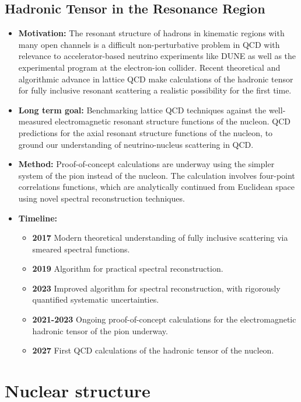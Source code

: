 \documentclass[12pt,hyperpdf]{article}
\begin{document}
\subsection{Hadronic Tensor in the Resonance Region}
\begin{itemize}
    \item{\bf Motivation:} The resonant structure of hadrons in kinematic regions with many open channels is a difficult non-perturbative problem in QCD with relevance to accelerator-based neutrino experiments like DUNE as well as the experimental program at the electron-ion collider.
    Recent theoretical and algorithmic advance in lattice QCD make calculations of the hadronic tensor for fully inclusive resonant scattering a realistic possibility for the first time.
    \item{\bf Long term goal:}
    Benchmarking lattice QCD techniques against the well-measured electromagnetic resonant structure functions of the nucleon.
    QCD predictions for the axial resonant structure functions of the nucleon, to ground our understanding of neutrino-nucleus scattering in QCD.
    \item{\bf Method:} Proof-of-concept calculations are underway using the simpler system of the pion instead of the nucleon.
	The calculation involves four-point correlations functions, which are analytically continued from Euclidean space using novel spectral reconstruction techniques.
\item{\bf Timeline:}
\begin{itemize}
    \item{\bf 2017} Modern theoretical understanding of fully inclusive scattering via smeared spectral functions.~\cite{Hansen:2017mnd}
    \item{\bf 2019} Algorithm for practical spectral reconstruction.~\cite{Hansen:2019idp}
    \item{\bf 2023} Improved algorithm for spectral reconstruction, with rigorously quantified systematic uncertainties.
    \item{\bf 2021-2023} Ongoing proof-of-concept calculations for the electromagnetic hadronic tensor of the pion underway.
    \item{\bf 2027} First QCD calculations of the hadronic tensor of the nucleon.
\end{itemize}
\end{itemize}

\section{Nuclear structure}\label{sec:nucstruct}
\end{document}
